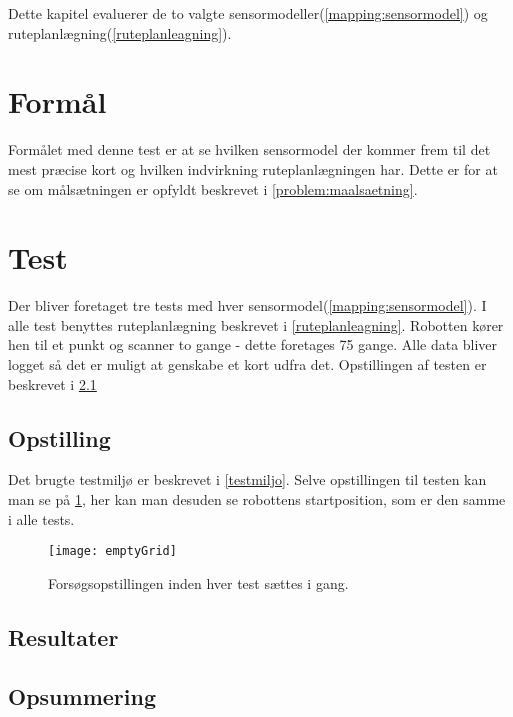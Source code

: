 Dette kapitel evaluerer de to valgte sensormodeller(\cref{mapping:sensormodel}) og ruteplanlægning(\cref{ruteplanleagning}).

\section{Formål}
Formålet med denne test er at se hvilken sensormodel der kommer frem til det mest præcise kort og hvilken indvirkning ruteplanlægningen har.
Dette er for at se om målsætningen er opfyldt beskrevet i \cref{problem:maalsaetning}.

\section{Test}\label{evaluering:test_beskrivelse}
Der bliver foretaget tre tests med hver sensormodel(\cref{mapping:sensormodel}).
I alle test benyttes ruteplanlægning beskrevet i \cref{ruteplanleagning}.
Robotten kører hen til et punkt og scanner to gange - dette foretages 75 gange.
Alle data bliver logget så det er muligt at genskabe et kort udfra det.
Opstillingen af testen er beskrevet i \cref{evaluering:opstilling}

\subsection{Opstilling}\label{evaluering:opstilling}
Det brugte testmiljø er beskrevet i \cref{testmiljo}.
Selve opstillingen til testen kan man se på \cref{evaluering:emptyGrid}, her kan man desuden se robottens startposition, som er den samme i alle tests.

\begin{figure}[h]
\texttt{[image: emptyGrid]}
\label{evaluering:emptyGrid}
\caption{Forsøgsopstillingen inden hver test sættes i gang.}
\end{figure}
\subsection{Resultater}

\subsection{Opsummering}